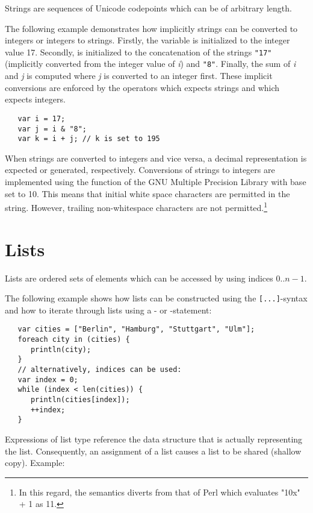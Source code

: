 Strings are sequences of Unicode codepoints which can be of arbitrary length.

The following example demonstrates how implicitly strings can be
converted to integers or integers to strings. Firstly, the variable
 is initialized to the integer value 17. Secondly, 
is initialized to the concatenation of the strings \lstinline!"17"!
(implicitly converted from the integer value of \textit{i}) and
\lstinline!"8"!. Finally, the sum of \textit{i} and \textit{j} is
computed where \textit{j} is converted to an integer first. These
implicit conversions are enforced by the operators \token{\&}
which expects strings and \token{+} which expects integers.

\begin{lstlisting}
   var i = 17;
   var j = i & "8";
   var k = i + j; // k is set to 195
\end{lstlisting}

When strings are converted to integers and vice versa,
a decimal representation is expected or generated, respectively.
Conversions of strings to integers are implemented using
the  function of the
GNU Multiple Precision Library
with base set to 10. This means that initial white space characters are
permitted in the string. However, trailing non-whitespace characters
are not permitted.\footnote{In this regard, the semantics diverts from that of
Perl which evaluates "10x" + 1 as 11.}

\section{Lists}\label{lists}

Lists are ordered sets of elements which can be accessed by
using indices $0..n-1$.

The following example shows how lists can be constructed
using the \lstinline![...]!-syntax and how to iterate through
lists using a - or -statement:

\begin{lstlisting}
   var cities = ["Berlin", "Hamburg", "Stuttgart", "Ulm"];
   foreach city in (cities) {
      println(city);
   }
   // alternatively, indices can be used:
   var index = 0;
   while (index < len(cities)) {
      println(cities[index]);
      ++index;
   }
\end{lstlisting}

\noindent
Expressions of list type reference the data structure that is
actually representing the list. Consequently,
an assignment of a list causes a list to be shared
(shallow copy). Example:

